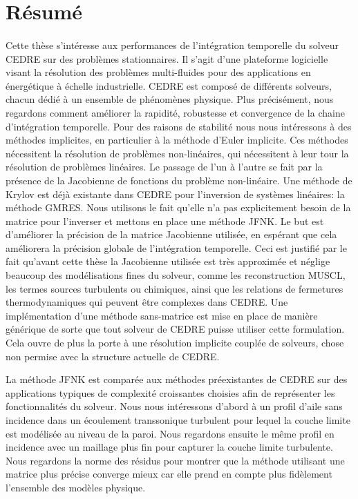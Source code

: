 \section{Résumé}

\paragraph{}
Cette thèse s'intéresse aux performances de l'intégration temporelle du solveur CEDRE sur des problèmes stationnaires.
Il s'agit d'une plateforme logicielle visant la résolution des problèmes multi-fluides pour des applications en énergétique à échelle industrielle.
CEDRE est composé de différents solveurs, chacun dédié à un ensemble de phénomènes physique.
Plus précisément, nous regardons comment améliorer la rapidité, robustesse et convergence de la chaine d’intégration temporelle.
Pour des raisons de stabilité nous nous intéressons à des méthodes implicites, en particulier à la méthode d'Euler implicite.
Ces méthodes nécessitent la résolution de problèmes non-linéaires, qui nécessitent à leur tour la résolution de problèmes linéaires.
Le passage de l'un à l'autre se fait par la présence de la Jacobienne de fonctions du problème non-linéaire.
Une méthode de Krylov est déjà existante dans CEDRE pour l'inversion de systèmes linéaires: la méthode GMRES.
Nous utilisons le fait qu'elle n'a pas explicitement besoin de la matrice pour l'inverser et mettons en place une méthode JFNK.
Le but est d'améliorer la précision de la matrice Jacobienne utilisée, en espérant que cela améliorera la précision globale de l'intégration temporelle.
Ceci est justifié par le fait qu'avant cette thèse la Jacobienne utilisée est très approximée et néglige beaucoup des modélisations fines du solveur, comme les reconstruction MUSCL, les termes sources turbulents ou chimiques, ainsi que les relations de fermetures thermodynamiques qui peuvent être complexes dans CEDRE.
Une implémentation d'une méthode sans-matrice est mise en place de manière générique de sorte que tout solveur de CEDRE puisse utiliser cette formulation.
Cela ouvre de plus la porte à une résolution implicite couplée de solveurs, chose non permise avec la structure actuelle de CEDRE.

La méthode JFNK est comparée aux méthodes préexistantes de CEDRE sur des applications typiques de complexité croissantes choisies afin de représenter les fonctionnalités du solveur.
Nous nous intéressons d'abord à un profil d'aile sans incidence dans un écoulement transsonique turbulent pour lequel la couche limite est modélisée au niveau de la paroi.
Nous regardons ensuite le même profil en incidence avec un maillage plus fin pour capturer la couche limite turbulente.
Nous regardons la norme des résidus pour montrer que la méthode utilisant une matrice plus précise converge mieux car elle prend en compte plus fidèlement l'ensemble des modèles physique.

